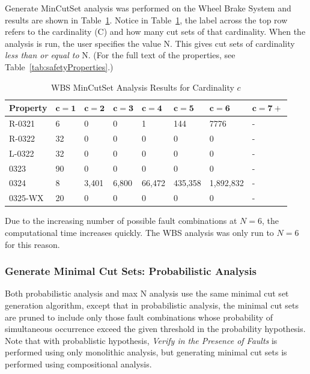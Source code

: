 Generate MinCutSet analysis was performed on the Wheel Brake System and results are shown in Table~\ref{tab:wbs_maxN_results}. Notice in Table~\ref{tab:wbs_maxN_results}, the label across the top row refers to the cardinality (C) and how many cut sets of that cardinality. When the analysis is run, the user specifies the value N. This gives cut sets of cardinality \textit{less than or equal to} N. (For the full text of the properties, see Table~\ref{tab:safetyProperties}.)

\begin{center}
\begin{table}[h]
    \begin{tabular}{ | l | l | l | l | l | l | l | l |}
    \hline
    \textbf{Property} & $\bm{c = 1}$ & $\bm{c = 2}$ & $\bm{c = 3}$ & $\bm{c = 4}$ 
		& $\bm{c = 5}$ & $\bm{c = 6}$ & $\bm{c = 7+}$  \\ \hline \hline
    R-0321 & 6 & 0 & 0 & 1& 144&7776 &- \\ \hline
    R-0322 & 32 & 0 & 0 &0 &0 &0 &- \\ \hline
    L-0322 & 32 & 0 & 0 &0 &0 &0 &- \\ \hline
    0323 & 90 & 0 & 0 &0 &0 &0 &- \\ \hline
    0324 & 8 & 3,401 & 6,800 &66,472 & 435,358&1,892,832 &- \\ \hline
    0325-WX & 20 & 0 & 0 &0 &0 & 0&- \\ \hline
    \end{tabular}
    \caption{WBS MinCutSet Analysis Results for Cardinality $c$}
    \label{tab:wbs_maxN_results}
\end{table}
\end{center}



Due to the increasing number of possible fault combinations at $N=6$, the computational time increases quickly. The WBS analysis was only run to $N=6$ for this reason. 

\subsubsection{Generate Minimal Cut Sets: Probabilistic Analysis}
\label{sec:prob_generate}
Both probabilistic analysis and max N analysis use the same minimal cut set generation algorithm, except that in probabilistic analysis, the minimal cut sets are pruned to include only those fault combinations whose probability of simultaneous occurrence exceed the given threshold in the probability hypothesis. Note that with probablistic hypothesis, \textit{Verify in the Presence of Faults} is performed using only monolithic analysis, but generating minimal cut sets is performed using compositional analysis.


